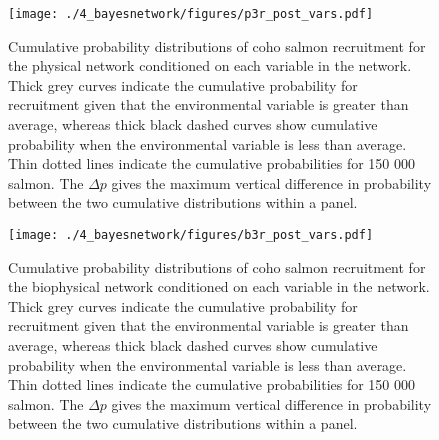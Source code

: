 \begin{figure}[htbp]
  \centering \texttt{[image: ./4\_bayesnetwork/figures/p3r\_post\_vars.pdf]}
  \caption[Cumulative probability distributions of coho salmon recruitment for
           the physical network conditioned on each variable in the
           network.]{Cumulative probability distributions of coho salmon
           recruitment for the physical network conditioned on each variable in
           the network. Thick grey curves indicate the cumulative probability
           for recruitment given that the environmental variable is greater than
           average, whereas thick black dashed curves show cumulative
           probability when the environmental variable is less than average.
           Thin dotted lines indicate the cumulative probabilities for
           150 000 salmon. The \(\Delta p\) gives the maximum vertical
           difference in probability between the two cumulative distributions
           within a panel.}
  \label{fig:bn:6}
\end{figure}

\begin{figure}[htbp]
  \centering \texttt{[image: ./4\_bayesnetwork/figures/b3r\_post\_vars.pdf]}
  \caption[Cumulative probability distributions of coho salmon recruitment for
           the biophysical network conditioned on each variable in the
           network.]{Cumulative probability distributions of coho salmon
           recruitment for the biophysical network conditioned on each variable
           in the network. Thick grey curves indicate the cumulative probability
           for recruitment given that the environmental variable is greater than
           average, whereas thick black dashed curves show cumulative
           probability when the environmental variable is less than average.
           Thin dotted lines indicate the cumulative probabilities for 150 000
           salmon. The \(\Delta p\) gives the maximum vertical difference in
           probability between the two cumulative distributions within a panel.}
  \label{fig:bn:7}
\end{figure}

